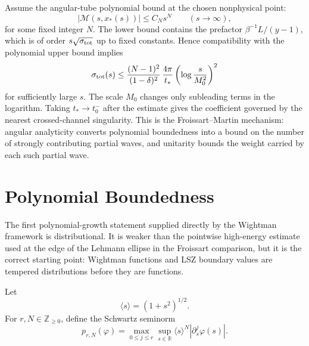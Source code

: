 Assume the angular-tube polynomial bound at the chosen nonphysical point:
\[
  |\mathcal M(s,x_*(s))|\le C_Ns^N
  \qquad(s\to\infty),
\]
for some fixed integer \(N\).  The lower bound contains the prefactor
\(\beta^{-1}L/(y-1)\), which is of order \(s\sqrt{\sigma_{\rm tot}}\) up to
fixed constants.  Hence compatibility with the polynomial upper bound implies
\[
  \sigma_{\rm tot}(s)
  \le
  \frac{(N-1)^2}{(1-\delta)^2}\,
  \frac{4\pi}{t_*}
  \left(\log\frac{s}{M_0^2}\right)^2
\]
for sufficiently large \(s\).  The scale \(M_0\) changes only subleading
terms in the logarithm.  Taking \(t_*\to t_0^-\) after the estimate gives
the coefficient governed by the nearest crossed-channel singularity.  This is
the Froissart--Martin mechanism: angular analyticity converts polynomial
boundedness into a bound on the number of strongly contributing partial waves,
and unitarity bounds the weight carried by each such partial wave.

\section{Polynomial Boundedness}

The first polynomial-growth statement supplied directly by the Wightman
framework is distributional.  It is weaker than the pointwise high-energy
estimate used at the edge of the Lehmann ellipse in the Froissart comparison,
but it is the correct starting point: Wightman functions and LSZ boundary
values are tempered distributions before they are functions.

Let
\[
  \langle s\rangle=(1+s^2)^{1/2}.
\]
For \(r,N\in\mathbb Z_{\ge0}\), define the Schwartz seminorm
\begin{equation}
  p_{r,N}(\varphi)
  =
  \max_{0\le j\le r}
  \sup_{s\in\mathbb R}
  \langle s\rangle^N
  |\partial_s^j\varphi(s)| .
  \label{eq:fixed-t-schwartz-seminorm}
\end{equation}

